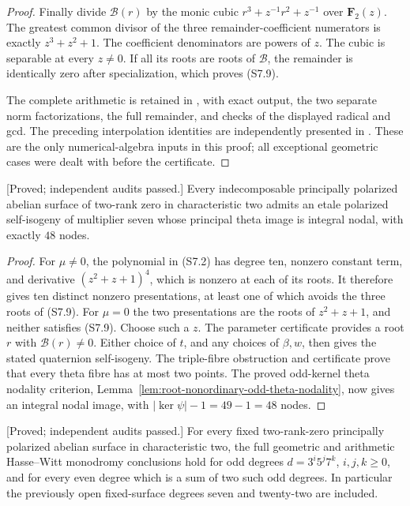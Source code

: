 \begin{proof}
Finally divide $\mathcal B(r)$ by the monic cubic
$r^3+z^{-1}r^2+z^{-1}$ over $\mathbf F_2(z)$. The greatest common
divisor of the three remainder-coefficient numerators is exactly
$z^3+z^2+1$. The coefficient denominators are powers of $z$.
The cubic is separable at every $z\ne0$. If all its roots are
roots of $\mathcal B$, the remainder is identically zero after
specialization, which proves (S7.9).

The complete arithmetic is retained in
, with exact
output, the two separate norm factorizations, the full remainder,
and checks of the displayed radical and gcd. The preceding
interpolation identities are independently presented in
. These are the
only numerical-algebra inputs in this proof; all exceptional
geometric cases were dealt with before the certificate.
\end{proof}

\begin{theorem}
\label{thm:uniform-seven-nodal-self-isogeny-candidate}
\textup{[Proved; independent audits passed.]}
Every indecomposable principally polarized abelian surface of
two-rank zero in characteristic two admits an etale polarized
self-isogeny of multiplier seven whose principal theta image is
integral nodal, with exactly $48$ nodes.
\end{theorem}

\begin{proof}
For $\mu\ne0$, the polynomial in (S7.2) has degree ten, nonzero
constant term, and derivative $(z^2+z+1)^4$, which is nonzero at
each of its roots. It therefore gives ten distinct nonzero
presentations, at least one of which avoids the three roots of
(S7.9). For $\mu=0$ the two presentations are the roots of
$z^2+z+1$, and neither satisfies (S7.9). Choose such a $z$.
The parameter certificate provides a root $r$ with
$\mathcal B(r)\ne0$. Either choice of $t$, and any choices of
$\beta,w$, then gives the stated quaternion self-isogeny.
The triple-fibre obstruction and certificate prove that every
theta fibre has at most two points. The proved odd-kernel theta
nodality criterion, Lemma~\ref{lem:root-nonordinary-odd-theta-nodality},
now gives an integral nodal image, with
$|\ker\psi|-1=49-1=48$ nodes.
\end{proof}

\begin{corollary}
\label{cor:f0-three-five-seven-degree-groups-candidate}
\textup{[Proved; independent audits passed.]}
For every fixed two-rank-zero principally polarized abelian surface
in characteristic two, the full geometric and arithmetic
Hasse--Witt monodromy conclusions hold for odd degrees
$d=3^i5^j7^k$, $i,j,k\ge0$, and for every even degree which is a
sum of two such odd degrees. In particular the previously open
fixed-surface degrees seven and twenty-two are included.
\end{corollary}

